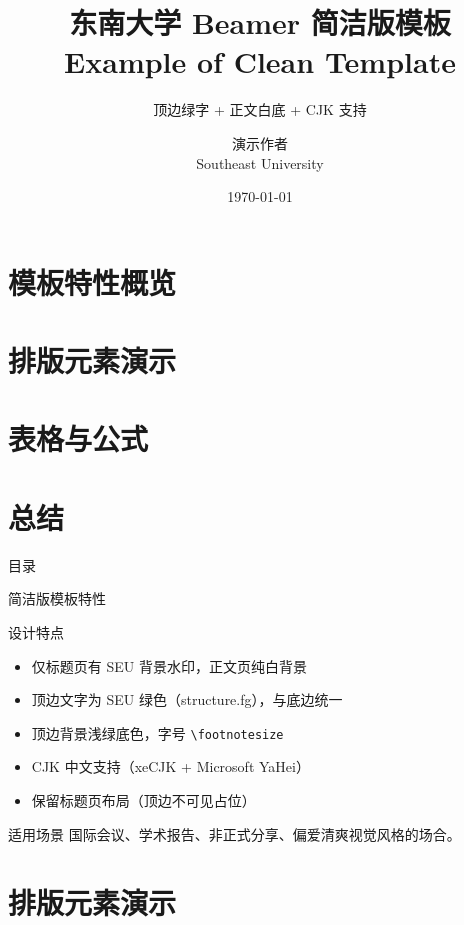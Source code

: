 \documentclass[aspectratio=169, 11pt]{beamer}
\title[简洁版模板示例]{东南大学 Beamer 简洁版模板 \\ Example of Clean Template}
\subtitle{顶边绿字 + 正文白底 + CJK 支持}
\author[演示作者]{演示作者 \\ Southeast University}
\date{\today}
\begin{document}
\begin{frame}
\titlepage
\end{frame}

\section{模板特性概览}
\section{排版元素演示}
\section{表格与公式}
\section{总结}

\begin{frame}{目\quad 录}
\tableofcontents
\end{frame}

\begin{frame}{简洁版模板特性}
\begin{block}{设计特点}
  \begin{itemize}
    \item 仅标题页有 SEU 背景水印，正文页纯白背景
    \item 顶边文字为 SEU 绿色（\textcolor{structure.fg}{structure.fg}），与底边统一
    \item 顶边背景浅绿底色，字号 \texttt{\textbackslash footnotesize}
    \item CJK 中文支持（xeCJK + Microsoft YaHei）
    \item 保留标题页布局（顶边不可见占位）
  \end{itemize}
\end{block}

\begin{exampleblock}{适用场景}
  国际会议、学术报告、非正式分享、偏爱清爽视觉风格的场合。
\end{exampleblock}
\end{frame}

\section{排版元素演示}
\end{document}
